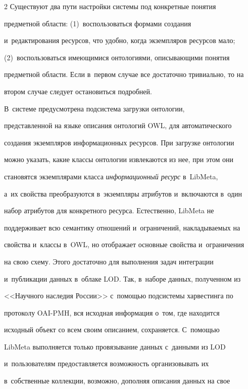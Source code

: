 \begin{multicols}{2}
    Существуют два пути настройки системы под конкретные понятия 

предметной области: (1)~воспользоваться формами создания 

и~редактирования ресурсов, что удобно, когда экземпляров ресурсов мало; 

(2)~воспользоваться имеющимися онтологиями, описывающими понятия 

предметной области. Если в~первом случае все достаточно тривиально, то на 

втором случае следует остановиться подробней.

{



}

    

    В~системе предусмотрена подсистема загрузки онтологии, 

представленной на языке описания онтологий OWL, для автоматического 

создания экземпляров информационных ресурсов. При загрузке онтологии 

можно указать, какие классы онтологии извлекаются из нее, при этом они 

становятся экземплярами класса \textit{информационный ресурс} в~\mbox{LibMeta}, 

а~их свойства преобразуются в~экземпляры атрибутов и~включаются в~один 

набор атрибутов для конкретного ресурса. Естественно, \mbox{LibMeta} не 

поддерживает всю семантику отношений и~ограничений, накладываемых на 

свойства и~классы в~OWL, но отображает основные свойства и~ограничения 

на свою схему. Этого достаточно для выполнения задач интеграции 

и~публикации данных в~облаке LOD. Так, в~наборе данных, полученном из 

<<Научного наследия России>> с~по\-мощью подсистемы харвестинга по 

протоколу OAI-PMH, вся исходная информация о~том, где находится 

исходный объект со всем своим описанием, сохраняется. С~по\-мощью 

\mbox{LibMeta} выполняется только провязывание данных с~данными из LOD 

и~пользователям предоставляется возможность организовывать их 

в~собственные коллекции, возможно, дополняя описания данных на свое 


\end{multicols}
